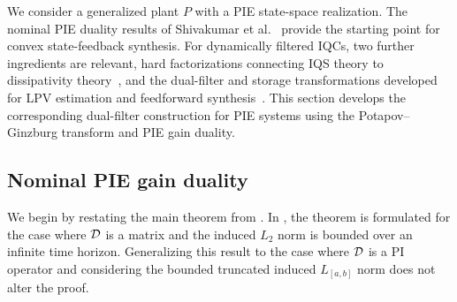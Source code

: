 We consider a generalized plant $P$ with a PIE state-space realization.
The nominal PIE duality results of Shivakumar et al.~\cite{shivaknew}
provide the starting point for convex state-feedback synthesis.
For dynamically filtered IQCs, two further ingredients are relevant,
hard factorizations connecting IQS theory to
dissipativity theory~\cite{6915700}, and the dual-filter and
storage transformations developed for LPV estimation and feedforward
synthesis~\cite{venkataraman}.
This section develops the corresponding dual-filter construction for PIE
systems using the Potapov--Ginzburg transform and PIE gain duality.

\subsection{Nominal PIE gain duality}
We begin by restating the main theorem from \cite{shivaknew}. In \cite{shivaknew}, 
the theorem is formulated for the case where $\mathcal{D}$ is a matrix and the 
induced $L_2$ norm is bounded over an infinite time horizon. Generalizing this result 
to the case where $\mathcal{D}$ is a PI operator and considering the bounded truncated 
induced $L_{[a,b]}$ norm does not alter the proof.




